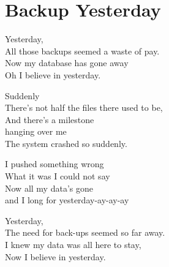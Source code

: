 \section{Backup Yesterday}

Yesterday,\\
All those backups seemed a waste of pay.\\
Now my database has gone away\\
Oh I believe in yesterday.


Suddenly\\
There's not half the files there used to be,\\
And there's a milestone\\
hanging over me\\
The system crashed so suddenly.


I pushed something wrong\\
What it was I could not say\\
Now all my data's gone\\
and I long for yesterday-ay-ay-ay


Yesterday,\\
The need for back-ups seemed so far away.\\
I knew my data was all here to stay,\\
Now I believe in yesterday.